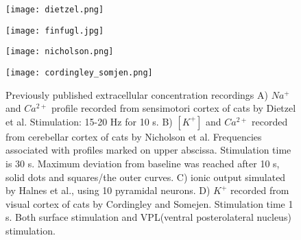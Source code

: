 \documentclass{article}
\begin{document}
\begin{figure}[!tbp]
  \centering
  \begin{minipage}[b]{0.45\textwidth}
    \texttt{[image: dietzel.png]}
  \end{minipage}
  \hfill
  \begin{minipage}[b]{0.45\textwidth}
    \texttt{[image: finfugl.jpg]}
  \end{minipage}
    \begin{minipage}[b]{0.45\textwidth}
    \texttt{[image: nicholson.png]}
  \end{minipage}
  \hfill
  \begin{minipage}[b]{0.45\textwidth}
    \texttt{[image: cordingley\_somjen.png]}
  \end{minipage}
  \caption{Previously published extracellular concentration recordings A) $Na^+$ and $Ca^{2+}$ profile recorded from sensimotori cortex of cats by Dietzel et al. Stimulation: 15-20 Hz for 10 s. B) $[K^+]$ and $Ca^{2+}$  recorded from cerebellar cortex of cats by Nicholson et al. Frequencies associated with profiles marked on upper abscissa. Stimulation time is 30 s. Maximum deviation from baseline was reached after 10 s, solid dots and squares/the outer curves. C) ionic output simulated by Halnes et al., using 10 pyramidal neurons. D) $K^+$ recorded from visual cortex of cats by Cordingley and Somejen. Stimulation time 1 s. Both surface stimulation and VPL(ventral posterolateral nucleus) stimulation.
}
  \label{fig:data sets}
\end{figure} 
\end{document}
